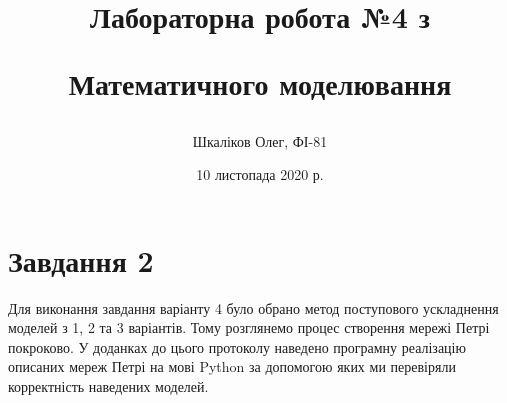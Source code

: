 \documentclass[a4paper]{article}
\title{\vspace{-5em}Лабораторна робота №4 з \par
Математичного моделювання}
\author{Шкаліков Олег, ФІ-81}
\date{ 10 листопада 2020 р.}
\begin{document}
\maketitle

\usetikzlibrary{arrows,decorations.pathmorphing,backgrounds,positioning,fit,petri}


\pagebreak
\section*{Завдання 2}
Для виконання завдання варіанту 4 було обрано метод
поступового ускладнення моделей з 1, 2 та 3 варіантів.
Тому розглянемо процес створення мережі Петрі покроково.
У доданках до цього протоколу наведено програмну реалізацію
описаних мереж Петрі на мові Python за допомогою яких ми перевіряли
корректність наведених моделей.




\pagebreak

\end{document}
